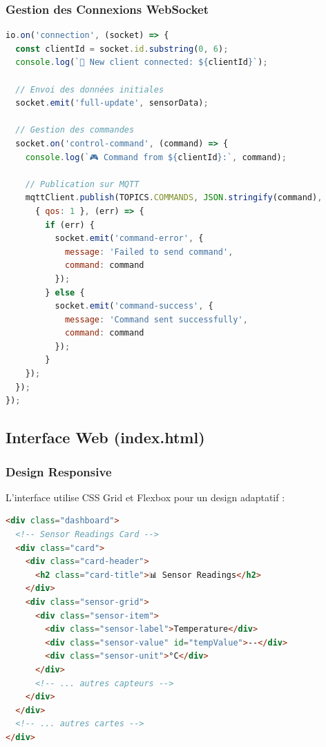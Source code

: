 \documentclass[12pt,a4paper]{article}
\begin{document}
\subsubsection{Gestion des Connexions WebSocket}
\begin{lstlisting}[language=javascript, caption=Gestion des événements Socket.IO]
io.on('connection', (socket) => {
  const clientId = socket.id.substring(0, 6);
  console.log(`🔌 New client connected: ${clientId}`);
  
  // Envoi des données initiales
  socket.emit('full-update', sensorData);
  
  // Gestion des commandes
  socket.on('control-command', (command) => {
    console.log(`🎮 Command from ${clientId}:`, command);
    
    // Publication sur MQTT
    mqttClient.publish(TOPICS.COMMANDS, JSON.stringify(command), 
      { qos: 1 }, (err) => {
        if (err) {
          socket.emit('command-error', { 
            message: 'Failed to send command',
            command: command 
          });
        } else {
          socket.emit('command-success', { 
            message: 'Command sent successfully',
            command: command 
          });
        }
    });
  });
});
\end{lstlisting}

\subsection{Interface Web (index.html)}

\subsubsection{Design Responsive}
L'interface utilise CSS Grid et Flexbox pour un design adaptatif :

\begin{lstlisting}[language=html, caption=Structure HTML responsive]
<div class="dashboard">
  <!-- Sensor Readings Card -->
  <div class="card">
    <div class="card-header">
      <h2 class="card-title">📊 Sensor Readings</h2>
    </div>
    <div class="sensor-grid">
      <div class="sensor-item">
        <div class="sensor-label">Temperature</div>
        <div class="sensor-value" id="tempValue">--</div>
        <div class="sensor-unit">°C</div>
      </div>
      <!-- ... autres capteurs -->
    </div>
  </div>
  <!-- ... autres cartes -->
</div>
\end{lstlisting}
\end{document}
